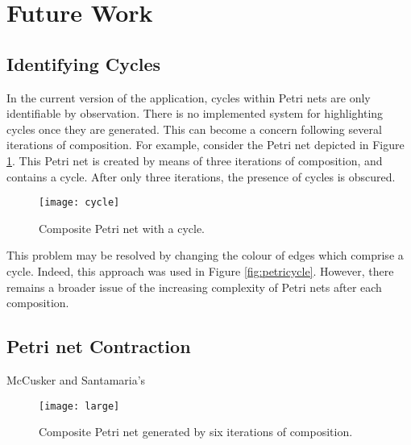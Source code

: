 \documentclass[../Dissertation.tex]{subfiles}
\begin{document}
\section{Future Work}

\subsection{Identifying Cycles}
In the current version of the application, cycles within Petri nets are only identifiable by observation. There is no implemented system for highlighting cycles once they are generated. This can become a concern following several iterations of composition. For example, consider the Petri net depicted in Figure \ref{fig:cycle}. This Petri net is created by means of three iterations of composition, and contains a cycle. After only three iterations, the presence of cycles is obscured.

\begin{figure}[H]
\begin{center}
\texttt{[image: cycle]}
\end{center}
\caption{Composite Petri net with a cycle.}
\label{fig:cycle}
\end{figure}

This problem may be resolved by changing the colour of edges which comprise a cycle. Indeed, this approach was used in Figure \ref{fig:petricycle}. However, there remains a broader issue of the increasing complexity of Petri nets after each composition.

\subsection{Petri net Contraction}
McCusker and Santamaria's

\begin{figure}[H]
\begin{center}
\texttt{[image: large]}
\end{center}
\caption{Composite Petri net generated by six iterations of composition.}
\label{fig:large}
\end{figure}
\end{document}
